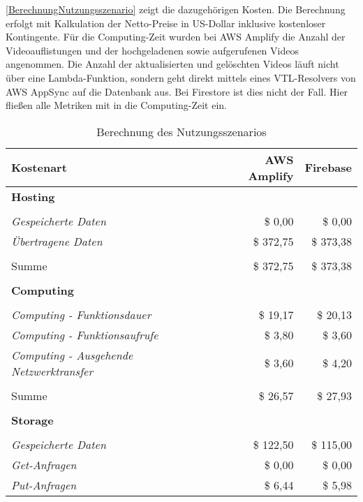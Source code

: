 \autoref{BerechnungNutzungsszenario} zeigt die dazugehörigen Kosten. Die Berechnung erfolgt mit Kalkulation der Netto-Preise in US-Dollar inklusive kostenloser Kontingente. Für die Computing-Zeit wurden bei \ac{AWS} Amplify die Anzahl der Videoauflistungen und der hochgeladenen sowie aufgerufenen Videos angenommen. Die Anzahl der aktualisierten und gelöschten Videos läuft nicht über eine Lambda-Funktion, sondern geht direkt mittels eines VTL-Resolvers von \ac{AWS} AppSync auf die Datenbank  aus. Bei Firestore ist dies nicht der Fall. Hier fließen alle Metriken mit in die Computing-Zeit ein.

\begin{table}[h]
  \caption{Berechnung des Nutzungsszenarios}
  \label{BerechnungNutzungsszenario}
  \renewcommand{\arraystretch}{1.2}
  \centering
  \sffamily
  \begin{footnotesize}
    \begin{tabularx}{0.9\textwidth}{l r r}
      \toprule
      \textbf{Kostenart} & \textbf{AWS Amplify} & \textbf{Firebase}\\
      \midrule
      \textbf{Hosting} &  &  \\
       &  &  \\
      \emph{Gespeicherte Daten} & \$ 0,00  & \$ 0,00 \\
      \emph{Übertragene Daten} & \$ 372,75 & \$ 373,38 \\
       &  &  \\
      Summe & \$ 372,75 & \$ 373,38 \\
       &  &  \\
      \textbf{Computing} &  &  \\
       &  &  \\
      \emph{Computing - Funktionsdauer} & \$ 19,17 & \$ 20,13 \\
      \emph{Computing - Funktionsaufrufe} & \$ 3,80 & \$ 3,60 \\
      \emph{Computing - Ausgehende Netzwerktransfer} & \$ 3,60 & \$ 4,20 \\
       &  &  \\
      Summe & \$ 26,57 & \$ 27,93 \\
       &  &  \\
      \textbf{Storage} &  &  \\
       &  &  \\
      \emph{Gespeicherte Daten} & \$ 122,50 & \$ 115,00 \\
      \emph{Get-Anfragen} & \$ 0,00 & \$ 0,00 \\
      \emph{Put-Anfragen} & \$ 6,44 & \$ 5,98 \\

\end{tabularx}
\end{footnotesize}
\end{table}
